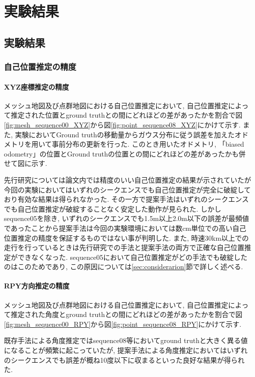\chapter{実験結果}

\section{実験結果}\label{sec:result}

\subsection{自己位置推定の精度}\label{sec:verify_localization}

\subsubsection{XYZ座標推定の精度}
メッシュ地図及び点群地図における自己位置推定において, 自己位置推定によって推定された位置とground truthとの間にどれほどの差があったかを割合で図\ref{fig:mesh_sequence00_XYZ}から図\ref{fig:point_sequence08_XYZ}にかけて示す. また, 実験においてGround truthの移動量からガウス分布に従う誤差を加えたオドメトリを用いて事前分布の更新を行った. このとき用いたオドメトリ, 「biased odometry」の位置とGround truthの位置との間にどれほどの差があったかも併せて図に示す.
\par 先行研究\cite{semantic_point_localization}については論文内では精度のいい自己位置推定の結果が示されていたが今回の実験においてはいずれのシークエンスでも自己位置推定が完全に破綻しており有効な結果は得られなかった. その一方で提案手法はいずれのシークエンスでも自己位置推定が破綻することなく安定した動作が見られた. しかしsequence05を除き, いずれのシークエンスでも1.5m以上2.0m以下の誤差が最頻値であったことから提案手法は今回の実験環境においては数cm単位での高い自己位置推定の精度を保証するものではない事が判明した. また, 時速30km以上での走行を行っているときは先行研究での手法と提案手法の両方で正確な自己位置推定ができなくなった. sequence05において自己位置推定がどの手法でも破綻したのはこのためであり, この原因については\ref{sec:considerarion}節で詳しく述べる.

\subsubsection{RPY方向推定の精度}
メッシュ地図及び点群地図における自己位置推定において, 自己位置推定によって推定された角度とground truthとの間にどれほどの差があったかを割合で図\ref{fig:mesh_sequence00_RPY}から図\ref{fig:point_sequence08_RPY}にかけて示す. \par 既存手法による角度推定ではsequence08等においてground truthと大きく異る値になることが頻繁に起こっていたが, 提案手法による角度推定においてはいずれのシークエンスでも誤差が概ね10度以下に収まるといった良好な結果が得られた.

